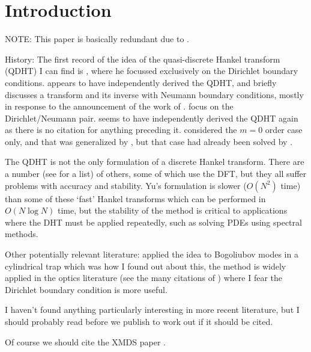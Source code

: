\documentclass[aip,amsmath,amssymb,reprint,twocolumn]{revtex4-1}
\begin{document}
\section{Introduction}
\label{sec:Introduction}

NOTE: This paper is basically redundant due to \citet{Kai-Ming:2009}.

History: The first record of the idea of the quasi-discrete Hankel transform (QDHT) I can find is \citet{Johnson:1987}, where he focussed exclusively on the Dirichlet boundary conditions.  \citet{Lemoine:1994} appears to have independently derived the QDHT, and briefly discusses a transform and its inverse with Neumann boundary conditions, mostly in response to the announcement of the work of \citet{Stade:1995}.  \citet{Stade:1995} focus on the Dirichlet/Neumann pair.  \citet{Yu:1998} seems to have independently derived the QDHT again as there is no citation for anything preceding it.  \citet{Yu:1998} considered the $m=0$ order case only, and that was generalized by \citet{Guizar-Sicairos:2004}, but that case had already been solved by \citet{Johnson:1987,Lemoine:1994}.  

The QDHT is not the only formulation of a discrete Hankel transform.  There are a number (see \citep{Yu:1998} for a list) of others, some of which use the DFT, but they all suffer problems with accuracy and stability.  Yu's formulation is slower ($O(N^2)$ time) than some of these `fast' Hankel transforms which can be performed in $O(N \log N)$ time, but the stability of the method is critical to applications where the DHT must be applied repeatedly, such as solving PDEs using spectral methods.

Other potentially relevant literature: \citet{Ronen:2006} applied the idea to Bogoliubov modes in a cylindrical trap which was how I found out about this, the method is widely applied in the optics literature (see the many citations of \citet{Guizar-Sicairos:2004}) where I fear the Dirichlet boundary condition is more useful.

I haven't found anything particularly interesting in more recent literature, but I should probably read \citet{Cerjan:2007} before we publish to work out if it should be cited.

Of course we should cite the XMDS paper \citep{Dennis:2013}.
\end{document}

